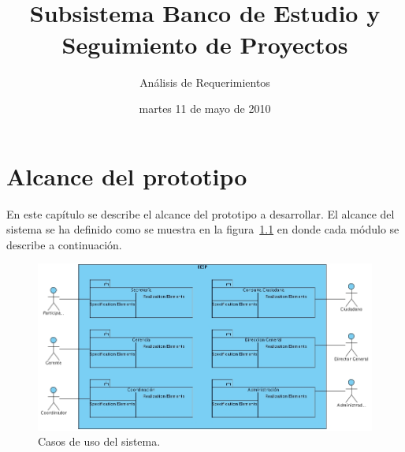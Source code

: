 \documentclass[10pt]{book}
\title{\Sistema \\\LARGE{Subsistema Banco de Estudio y Seguimiento de Proyectos \\}}
\subtitle{Análisis de Requerimientos}
\date{martes 11 de mayo de 2010}
\begin{document}

\frontmatter
\tableofcontents

\mainmatter


\chapter{Alcance del prototipo}

	En este capítulo se describe el alcance del prototipo a desarrollar. El alcance del sistema se ha definido como se muestra en la figura~\ref{fig:casosDeUsoCompleto} en donde cada módulo se describe a continuación.

\begin{figure}[htbp!]
	\begin{center}
		\includegraphics[width=1\textwidth]{images/alcance.jpg}
		\caption{Casos de uso del sistema.}
		\label{fig:casosDeUsoCompleto}
	\end{center}
\end{figure}
\end{document}
